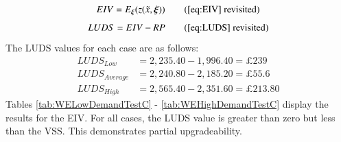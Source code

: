 \documentclass[../thesis.tex]{subfiles}
\begin{document}
\begin{equation}
    EIV = E_{\boldsymbol{\xi}}(z(\Tilde{x},\boldsymbol{\xi})) \tag{\ref{eq:EIV} revisited}
\end{equation}
\begin{equation}
    LUDS = EIV - RP \tag{\ref{eq:LUDS} revisited}
\end{equation}
The LUDS values for each case are as follows:
\begin{align}
    LUDS_{Low} &= 2,235.40 - 1,996.40 = \pounds239 \\
    LUDS_{Average} &= 2,240.80 - 2,185.20 = \pounds55.6 \\
    LUDS_{High} &= 2,565.40 - 2,351.60 = \pounds213.80
\end{align}
Tables \ref{tab:WELowDemandTestC} - \ref{tab:WEHighDemandTestC} display the results for the EIV. For all cases, the LUDS value is greater than zero but less than the VSS. This demonstrates partial upgradeability.

\begin{table}[h!]
    \centering{}
    \caption{Test C results for the worked example using low daily bed demand values, with results recorded in the form [(beds), (staff)].}
    \label{tab:WELowDemandTestC}
\end{table}
\end{document}

